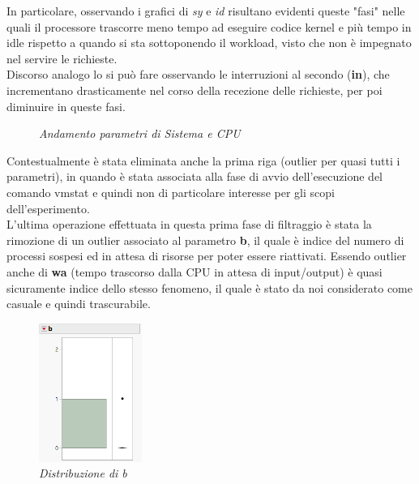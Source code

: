 In particolare, osservando i grafici di \textit{sy} e \textit{id} risultano evidenti queste "fasi" nelle quali il processore trascorre meno tempo ad eseguire codice kernel e più tempo in idle rispetto a quando si sta sottoponendo il workload, visto che non è impegnato nel servire le richieste.
\\
Discorso analogo lo si può fare osservando le interruzioni al secondo (\textbf{in}), che incrementano drasticamente nel corso della recezione delle richieste, per poi diminuire in queste fasi.
\begin{figure}[H]
	\centering   
	\caption{\textit{Andamento parametri di Sistema e CPU}}
\end{figure}
Contestualmente è stata eliminata anche la prima riga (outlier per quasi tutti i parametri), in quando è stata associata alla fase di avvio dell'esecuzione del comando vmstat e quindi non di particolare interesse per gli scopi dell'esperimento.
\\
L'ultima operazione effettuata in questa prima fase di filtraggio è stata la rimozione di un outlier associato al parametro \textbf{b}, il quale è indice del numero di processi sospesi ed in attesa di risorse per poter essere riattivati.
Essendo outlier anche di \textbf{wa} (tempo trascorso dalla CPU in attesa di input/output) è quasi sicuramente indice dello stesso fenomeno, il quale è stato da noi considerato come casuale e quindi trascurabile.
\begin{figure}[H]
	\centering
	\includegraphics[width=0.3\textwidth]{img/hw3/outlaier_b.png}
	\caption{\textit{Distribuzione di b}}
\end{figure}
